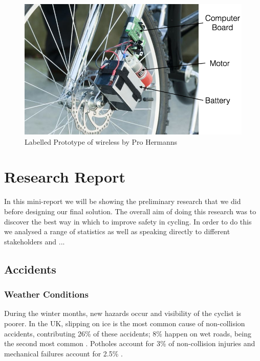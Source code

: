 \documentclass[a4paper]{report}
\begin{document}
{\begin{figure}[h]
\centering
\includegraphics[scale=0.5]{figures/electronic_braking/wireless_bicycle_brakes_labelled}
\caption{Labelled Prototype of wireless by Pro Hermanns \citep{wireless_bicycle_brakes}}
\label{fig:wireless_bicycle_brakes}
\end{figure}


\chapter{Research Report}
In this mini-report we will be showing the preliminary research that we did before designing our final solution. The overall aim of doing this research was to discover the best way in which to improve safety in cycling. In order to do this we analysed a range of statistics as well as speaking directly to different stakeholders and ...
\newpage
\section{Accidents}
\subsection{Weather Conditions}
During the winter months, new hazards occur and visibility of the cyclist is poorer. In the UK, slipping on ice is the most common cause of non-collision accidents, contributing 26\% of these accidents; 8\% happen on wet roads, being the second most common \citep{winter_safety}. Potholes account for 3\% of non-collision injuries and mechanical failures account for 2.5\% \citep{non-collision_casestudy}.


}
\end{document}
